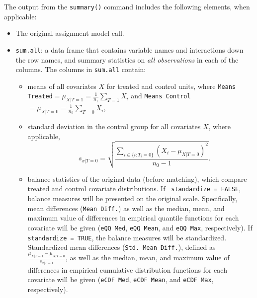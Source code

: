 The output from the \texttt{summary()} command includes the following
elements, when applicable:
\begin{itemize}
\item The original assignment model call.
\item \texttt{sum.all}: a data frame that contains variable names and
  interactions down the row names, and summary statistics on \emph{all
    observations} in each of the columns.  The columns in
  \texttt{sum.all} contain: 
  \begin{itemize}
  \item means of all covariates $X$ for treated and control units,
    where \texttt{Means Treated}$= \mu_{X|T=1} = \frac{1}{n_1}
    \sum_{T=1} X_i$ and \texttt{Means Control}$= \mu_{X|T=0} =
    \frac{1}{n_0} \sum_{T=0} X_i$,
 \item standard deviation in the control group for all covariates $X$, where applicable, 
        $$\quad s_{x|T=0} = \sqrt{\frac{\sum_{i \in \{i: T_i=0\}}
        (X_i - \mu_{X|T=0})^2}{n_0-1} }.$$
  \item balance statistics of the original data (before matching),
    which compare treated and control covariate distributions. If {\tt
      standardize = FALSE}, balance measures will be presented on the
    original scale. Specifically, mean differences (\texttt{Mean
      Diff.}) as well as the median, mean, and maximum value of
    differences in empirical quantile functions for each covariate
    will be given (\texttt{eQQ Med}, \texttt{eQQ Mean}, and
    \texttt{eQQ Max}, respectively). If {\tt standardize = TRUE}, the
    balance measures will be standardized.  Standardized mean
    differences (\texttt{Std.\ Mean Diff.}), defined as
    $\frac{\mu_{X|T=1} - \mu_{X|T=0}}{s_{x|T=1}}$, as well as the
    median, mean, and maximum value of differences in empirical
    cumulative distribution functions for each covariate will be given
    (\texttt{eCDF Med}, \texttt{eCDF Mean}, and \texttt{eCDF Max},
    respectively).
  \end{itemize}
  

\end{itemize}
